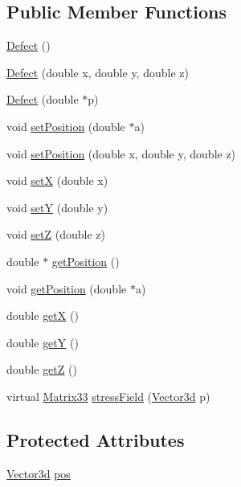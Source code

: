 \subsection*{Public Member Functions}
\begin{DoxyCompactItemize}
\item 
\hyperlink{classDefect_afc84dd2d7250a01746ee67b002dbbad9}{Defect} ()
\item 
\hyperlink{classDefect_aaddcb1db4b47037adf2e495665f41bab}{Defect} (double x, double y, double z)
\item 
\hyperlink{classDefect_a5bd123214102a5115c46b0a15653d29b}{Defect} (double $\ast$p)
\item 
void \hyperlink{classDefect_a2d233d13a8a93f6fba463a1fbc1c6c9f}{set\-Position} (double $\ast$a)
\item 
void \hyperlink{classDefect_ad1a6acd8399d2ecabb7ce2b77623bbec}{set\-Position} (double x, double y, double z)
\item 
void \hyperlink{classDefect_a5a65f73da6a572d9e7109b31239e441d}{set\-X} (double x)
\item 
void \hyperlink{classDefect_a268606391a4eaee3de029d2005648b6f}{set\-Y} (double y)
\item 
void \hyperlink{classDefect_abb0b16c44a1b04d782f5c5f598b49d5b}{set\-Z} (double z)
\item 
double $\ast$ \hyperlink{classDefect_a6842fba3ad14032766ccf0437afcbced}{get\-Position} ()
\item 
void \hyperlink{classDefect_aace5c752b85c368631746abc3d5bd714}{get\-Position} (double $\ast$a)
\item 
double \hyperlink{classDefect_a01b96c453c13db82b5835682e1849dc0}{get\-X} ()
\item 
double \hyperlink{classDefect_a9ea8df3b4c621762a327813056e63911}{get\-Y} ()
\item 
double \hyperlink{classDefect_a6f59edeca7ca8bfa01c54fd6b1a62374}{get\-Z} ()
\item 
virtual \hyperlink{classMatrix33}{Matrix33} \hyperlink{classDefect_a2a2c8170e7fa9e2247527291483ce586}{stress\-Field} (\hyperlink{classVector3d}{Vector3d} p)
\end{DoxyCompactItemize}
\subsection*{Protected Attributes}
\begin{DoxyCompactItemize}
\item 
\hyperlink{classVector3d}{Vector3d} \hyperlink{classDefect_aed2731c1beefc22e3db6ad5b18194cdd}{pos}
\end{DoxyCompactItemize}


